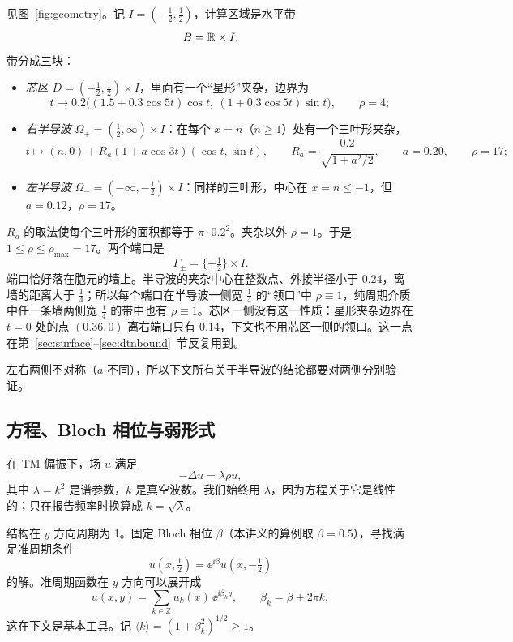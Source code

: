 \documentclass[11pt,a4paper,fontset=fandol]{ctexart}
\begin{document}
见图~\ref{fig:geometry}。记 $I=(-\tfrac12,\tfrac12)$，计算区域是水平带
\[
B=\mathbb R\times I .
\]
带分成三块：
\begin{itemize}
\item \emph{芯区} $D=(-\tfrac12,\tfrac12)\times I$，里面有一个“星形”夹杂，边界为
\[
t\mapsto 0.2\bigl((1.5+0.3\cos5t)\cos t,\ (1+0.3\cos5t)\sin t\bigr),\qquad \rho=4 ;
\]
\item \emph{右半导波} $\Omega_+=(\tfrac12,\infty)\times I$：在每个 $x=n$（$n\ge1$）处有一个三叶形夹杂，
\[
t\mapsto (n,0)+R_a(1+a\cos3t)(\cos t,\sin t),\qquad R_a=\frac{0.2}{\sqrt{1+a^2/2}},\qquad a=0.20,\qquad\rho=17 ;
\]
\item \emph{左半导波} $\Omega_-=(-\infty,-\tfrac12)\times I$：同样的三叶形，中心在 $x=n\le-1$，但 $a=0.12$，$\rho=17$。
\end{itemize}
$R_a$ 的取法使每个三叶形的面积都等于 $\pi\cdot0.2^2$。夹杂以外 $\rho=1$。于是 $1\le\rho\le\rho_{\max}=17$。两个端口是
\[
\Gamma_\pm=\{\pm\tfrac12\}\times I .
\]
端口恰好落在胞元的墙上。半导波的夹杂中心在整数点、外接半径小于 $0.24$，离墙的距离大于 $\tfrac14$；所以每个端口在半导波一侧宽 $\tfrac14$ 的“领口”中 $\rho\equiv1$，纯周期介质中任一条墙两侧宽 $\tfrac14$ 的带中也有 $\rho\equiv1$。芯区一侧没有这一性质：星形夹杂边界在 $t=0$ 处的点 $(0.36,0)$ 离右端口只有 $0.14$，下文也不用芯区一侧的领口。这一点在第~\ref{sec:surface}--\ref{sec:dtnbound}~节反复用到。

左右两侧不对称（$a$ 不同），所以下文所有关于半导波的结论都要对两侧分别验证。

\subsection{方程、Bloch 相位与弱形式}

在 TM 偏振下，场 $u$ 满足
\begin{equation}
\label{eq:helmholtz}
-\Delta u=\lambda\rho u ,
\end{equation}
其中 $\lambda=k^2$ 是谱参数，$k$ 是真空波数。我们始终用 $\lambda$，因为方程关于它是线性的；只在报告频率时换算成 $k=\sqrt\lambda$。

结构在 $y$ 方向周期为 1。固定 Bloch 相位 $\beta$（本讲义的算例取 $\beta=0.5$），寻找满足准周期条件
\begin{equation}
\label{eq:qp}
u(x,\tfrac12)=\ee^{\ii\beta}u(x,-\tfrac12)
\end{equation}
的解。准周期函数在 $y$ 方向可以展开成
\begin{equation}
\label{eq:fourier-y}
u(x,y)=\sum_{k\in\mathbb Z}u_k(x)\,\ee^{\ii\beta_ky},\qquad \beta_k=\beta+2\pi k ,
\end{equation}
这在下文是基本工具。记 $\langle k\rangle=(1+\beta_k^2)^{1/2}\ge1$。
\end{document}
